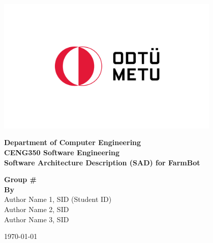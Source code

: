 \begin{titlepage}
   \begin{center}

       \includegraphics[width=0.8\textwidth]{Figures/metu_logo.png}
       \vspace{0.0cm}
     
            
        \textbf{\LARGE Department of  Computer Engineering} \\
        \vspace{0.5cm}
        \textbf{\LARGE CENG350 Software Engineering}\\
        \vspace{0.5cm} 
        \textbf{\LARGE Software Architecture Description (SAD) for FarmBot} \\
        \vspace{1.5cm} 
 

        \textbf{Group \#}\\
       \textbf{\textbf{By}} \\Author Name 1, SID (Student ID) \\ Author Name 2, SID \\ Author Name 3, SID \\
       

       \vspace{1.5cm}
            
    
\vspace{0.5cm}
            


\today            
   \end{center}
\end{titlepage}